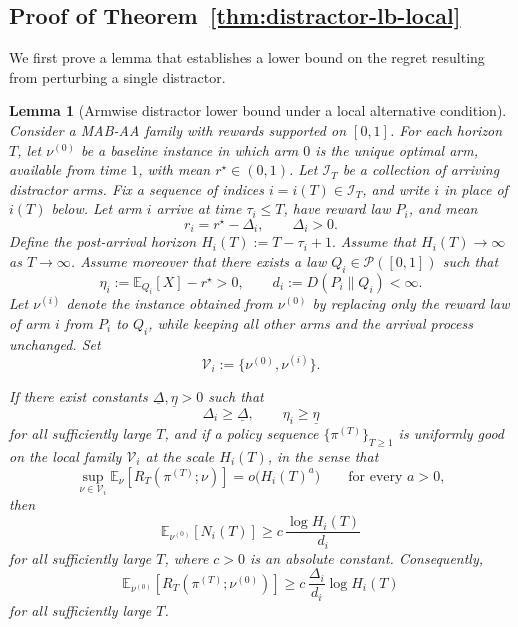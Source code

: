 \documentclass[
  12pt]{article}
\newtheorem{lemma}{Lemma}
\begin{document}
\subsection{Proof of Theorem~\ref{thm:distractor-lb-local}}
\label{sec:Proof of thm:distractor-lb-local}
We first prove a lemma that establishes a lower bound on the regret resulting from perturbing a single distractor.
\begin{lemma}[Armwise distractor lower bound under a local alternative condition]
\label{lem:distractor-lb-armwise-local}
Consider a MAB-AA family with rewards supported on $[0,1]$. For each horizon
$T$, let $\nu^{(0)}$ be a baseline instance in which arm $0$ is the unique
optimal arm, available from time $1$, with mean $r^\star\in(0,1)$. Let
$\mathcal I_T$ be a collection of arriving distractor arms. Fix a sequence of
indices $i=i(T)\in\mathcal I_T$, and write $i$ in place of $i(T)$ below. Let arm $i$ arrive at time $\tau_i\le T$, have reward law $P_i$, and mean
\[
r_i=r^\star-\Delta_i,
\qquad
\Delta_i>0.
\]
Define the post-arrival horizon \(H_i(T):=T-\tau_i+1.\) Assume that $H_i(T)\to\infty$ as $T\to\infty$. Assume moreover that there exists a law $Q_i\in\mathcal P([0,1])$ such that
\[
\eta_i:=\mathbb E_{Q_i}[X]-r^\star>0,
\qquad
d_i:=D(P_i\|Q_i)<\infty.
\]
Let $\nu^{(i)}$ denote the instance obtained from $\nu^{(0)}$ by replacing only
the reward law of arm $i$ from $P_i$ to $Q_i$, while keeping all other arms and
the arrival process unchanged. Set
\[
\mathcal V_i:=\{\nu^{(0)},\nu^{(i)}\}.
\]

If there exist constants $\underline\Delta,\underline\eta>0$ such that
\[
\Delta_i\ge \underline\Delta,
\qquad
\eta_i\ge \underline\eta
\]
for all sufficiently large $T$, and if a policy sequence
$\{\pi^{(T)}\}_{T\ge1}$ is uniformly good on the local family $\mathcal V_i$ at
the scale $H_i(T)$, in the sense that
\[
\sup_{\nu\in\mathcal V_i}\mathbb E_\nu[R_T(\pi^{(T)};\nu)]
=
o\bigl(H_i(T)^a\bigr)
\qquad
\text{for every }a>0,
\]
then
\[
\mathbb E_{\nu^{(0)}}[N_i(T)]
\ge
c\,\frac{\log H_i(T)}{d_i}
\]
for all sufficiently large $T$, where $c>0$ is an absolute constant.
Consequently,
\[
\mathbb E_{\nu^{(0)}}[R_T(\pi^{(T)};\nu^{(0)})]
\ge
c\,\frac{\Delta_i}{d_i}\log H_i(T)
\]
for all sufficiently large $T$.
\end{lemma}
\end{document}
